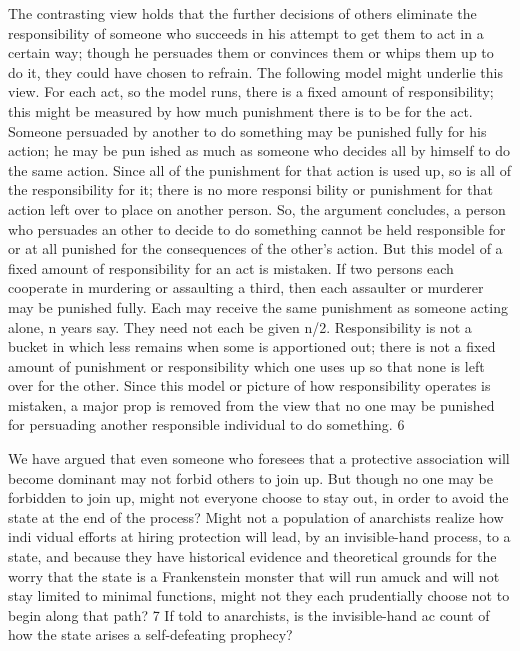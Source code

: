 \documentclass[11pt,openany]{book}
\begin{document}
The contrasting view holds that the further decisions of others eliminate the responsibility of someone who succeeds in his attempt to get them to act in a certain way; though he persuades them or convinces them or whips them up to do it, they could have chosen to refrain. The following model might underlie this view. For each act, so the model runs, there is a fixed amount of responsibility; this might be measured by how much punishment there is to be for the act. Someone persuaded by another to do something may be punished fully for his action; he may be pun ished as much as someone who decides all by himself to do the same action. Since all of the punishment for that action is used up, so is all of the responsibility for it; there is no more responsi bility or punishment for that action left over to place on another person. So, the argument concludes, a person who persuades an other to decide to do something cannot be held responsible for or at all punished for the consequences of the other's action. But this model of a fixed amount of responsibility for an act is mistaken. If two persons each cooperate in murdering or assaulting a third, then each assaulter or murderer may be punished fully. Each may receive the same punishment as someone acting alone, n years say. They need not each be given n/2. Responsibility is not a bucket in which less remains when some is apportioned out; there is not a fixed amount of punishment or responsibility which one uses up so that none is left over for the other. Since this model or picture of how responsibility operates is mistaken, a major prop is removed from the view that no one may be punished for persuading another responsible individual to do something. 6 

We have argued that even someone who foresees that a protective association will become dominant may not forbid others to join up. But though no one may be forbidden to join up, might not everyone choose to stay out, in order to avoid the state at the end of the process? Might not a population of anarchists realize how indi vidual efforts at hiring protection will lead, by an invisible-hand process, to a state, and because they have historical evidence and theoretical grounds for the worry that the state is a Frankenstein monster that will run amuck and will not stay limited to minimal functions, might not they each prudentially choose not to begin along that path? 7 If told to anarchists, is the invisible-hand ac count of how the state arises a self-defeating prophecy? 
\end{document}
